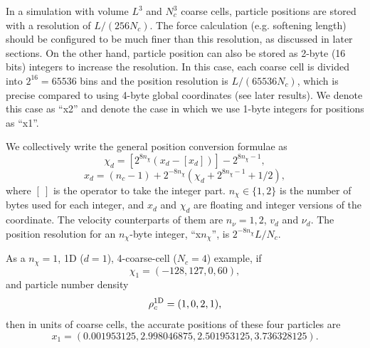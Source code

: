 \documentclass[10pt,twocolumn,reprint]{emulateapj}
\begin{document}
In a simulation with volume $L^3$ and $N_c^3$ coarse cells, particle positions are stored with a resolution of $L/(256N_c)$. The force calculation (e.g. softening length) should be configured to be much finer than this resolution, as discussed in later sections. On the other hand, particle position can also be stored as 2-byte (16 bits) integers to increase the resolution. In this case, each coarse cell is divided into $2^{16}=65536$ bins and the position resolution is $L/(65536N_c)$, which is precise compared to using 4-byte global coordinates (see later results). We denote this case as ``x2'' and denote the case in which we use 1-byte integers for positions as ``x1''.

We collectively write the general position conversion formulae as
\begin{equation}\label{eq.chi}
	\chi_d=\left[2^{8n_\chi}(x_d-\left[x_d\right])\right]-2^{8n_\chi-1},
\end{equation}
\begin{equation}\label{eq.x}
	x_d=(n_c-1)+2^{-8n_\chi}\left(\chi_d+2^{8n_\chi-1}+1/2\right),
\end{equation}
where $[\ ]$ is the operator to take the integer part. $n_\chi\in\{1,2\}$ is the number of bytes used for each integer, and $x_d$ and $\chi_d$ are floating and integer versions of the coordinate. The velocity counterparts of them are $n_\nu=1,2$, $v_d$ and $\nu_d$.
The position resolution for an $n_\chi$-byte integer, ``x$n_\chi$'', is $2^{-8n_\chi}L/N_c$.

As a $n_\chi=1$, 1D ($d=1$), 4-coarse-cell ($N_c=4$) example, if $$\chi_1=(-128,127,0,60),$$ and particle number density $${\rho_c^{\rm 1D}}=(1,0,2,1),$$ then in units of coarse cells, the accurate positions of these four particles are $$x_1=(0.001953125, 2.998046875, 2.501953125, 3.736328125).$$
\end{document}
